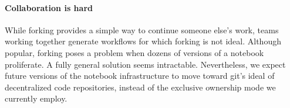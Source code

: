 \paragraph*{Collaboration is hard}
While forking provides a simple way to continue someone else's work,
teams working together generate workflows for which forking is not
ideal.  Although popular, forking poses a problem when dozens of
versions of a notebook proliferate. A fully general solution seems
intractable. Nevertheless, we expect future versions of the
notebook infrastructure to move toward git's ideal of decentralized
code repositories, instead of the exclusive ownership mode we
currently employ.

